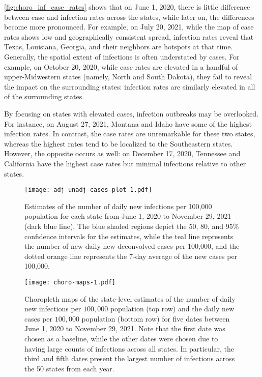 \autoref{fig:choro_inf_case_rates} shows that on June 1, 2020, there is little
difference between case and infection rates across the states, while
later on, the differences become more pronounced.
For example, on July 20, 2021, while the map of case rates shows low and
geographically consistent spread, infection rates reveal that Texas, Louisiana,
Georgia, and their neighbors are hotspots at that time. Generally, the spatial
extent of infections is often understated by cases. For example, on October 20,
2020, while case rates are elevated in a handful of upper-Midwestern states
(namely, North and South Dakota), they fail to reveal the impact on the
surrounding states: infection rates are similarly elevated in all of the
surrounding states. 

By focusing on states with elevated cases, infection outbreaks may be
overlooked. For instance, on August 27, 2021, Montana and Idaho have some of the
highest infection rates. In contrast, the case rates are unremarkable for these
two states, whereas the highest rates tend to be localized to the Southeastern
states. However, the opposite occurs as well: on December
17, 2020, Tennessee and California have the highest case rates but minimal
infections relative to other states.

\begin{figure}[!tb]
\centering
\texttt{[image: adj-unadj-cases-plot-1.pdf]} 
\caption{Estimates of the number of daily new infections per 100,000
population for each \US state from June 1, 2020 to November 29, 2021
(dark blue line). The blue shaded regions depict the 50, 80, and 95\%
confidence intervals for the estimates, while the teal line represents
the number of new daily new deconvolved cases per 100,000, and the
dotted orange line represents the 7-day average of the new cases per
100,000.}
\label{fig:state_infect_est}
\end{figure}


\begin{figure}[!tb]
\centering
\texttt{[image: choro-maps-1.pdf]}
\caption{Choropleth maps of the state-level estimates of the number of daily new
infections per $100,000$ population (top row) and the daily new cases per
$100,000$ population (bottom row) for five dates between June 1, 2020 to
November 29, 2021. Note that the first date was chosen as a baseline, while the
other dates were chosen due to having large counts of infections across all
states. In particular, the third and fifth dates present the largest number of
infections across the 50 states from each year.} 
\label{fig:choro_inf_case_rates}
\end{figure}    




